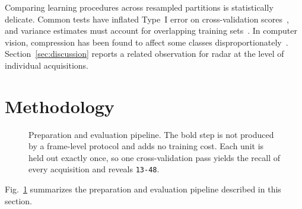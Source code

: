 \documentclass{ICIC2026}
\begin{document}
Comparing learning procedures across resampled partitions is statistically delicate. Common tests have inflated Type~I error on cross-validation scores~\cite{dietterich1998}, and variance estimates must account for overlapping training sets~\cite{nadeau2003}. In computer vision, compression has been found to affect some classes disproportionately~\cite{hooker2019,tran2022}. Section~\ref{sec:discussion} reports a related observation for radar at the level of individual acquisitions.

\section{Methodology}
\label{sec:method}

\begin{figure}[t]
\centering
{}
\caption{Preparation and evaluation pipeline. The bold step is not produced by a frame-level protocol and adds no training cost. Each unit is held out exactly once, so one cross-validation pass yields the recall of every acquisition and reveals \texttt{13-48}.}
\label{fig:pipeline}
\end{figure}

Fig.~\ref{fig:pipeline} summarizes the preparation and evaluation pipeline described in this section.
\end{document}
